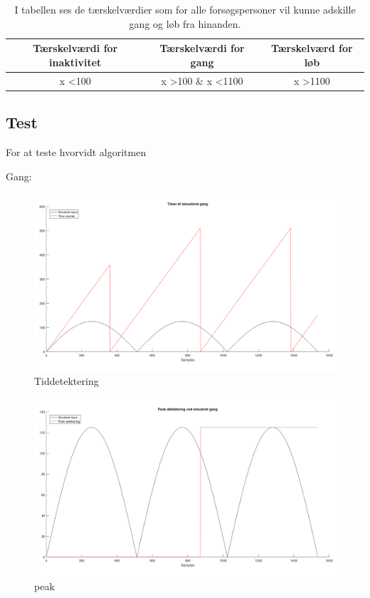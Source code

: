 \begin{table}[H]
	\centering
	\begin{tabular}{ccc}
		\hline
		\rowcolor[HTML]{C0C0C0} 
		Tærskelværdi for inaktivitet & Tærskelværdi for gang & Tærskelværd for løb \\ \hline
		x \textless 100 & x \textgreater 100 \& x \textless 1100 & x \textgreater 1100 \\ \hline
	\end{tabular}
	\caption{I tabellen ses de tærskelværdier som for alle forsøgspersoner vil kunne adskille gang og løb fra hinanden.}
	\label{tab:faelles_taerskel}
\end{table}




\subsection{Test}
For at teste hvorvidt algoritmen 


Gang:
\begin{figure}[H]
	\centering
	\includegraphics[scale=0.6]{figures/cDesign/test_timecount_gang.png}
	\caption{Tiddetektering }
	\label{fig:algoritme_cykling}
\end{figure}

\begin{figure}[H]
	\centering
	\includegraphics[scale=0.6]{figures/cDesign/test_peak_gang.png}
	\caption{peak}
	\label{fig:algoritme_cykling}
\end{figure}


